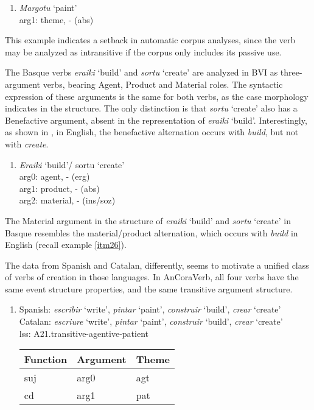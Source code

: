 \documentclass[english]{textolivre}
\begin{document}
\begin{enumerate}[label=(\arabic*),resume]
\item \label{itm32} \textit{Margotu} ‘paint’ \\
arg1: theme, - (abs)
\end{enumerate}
   
This example indicates a setback in automatic corpus analyses, since the verb may be analyzed as intransitive if the corpus only includes its passive use.

The Basque verbs \textit{eraiki} ‘build’ and \textit{sortu} ‘create’ are analyzed in BVI as three-argument verbs, bearing Agent, Product and Material roles. The syntactic expression of these arguments is the same for both verbs, as the case morphology indicates in the structure. The only distinction is that \textit{sortu} ‘create’ also has a Benefactive argument, absent in the representation of \textit{eraiki} ‘build’. Interestingly, as shown in , in English, the benefactive alternation occurs with \textit{build}, but not with \textit{create}.

\begin{enumerate}[label=(\arabic*),resume]
\item \label{itm33}\textit{Eraiki} ‘build’/ sortu ‘create’ \\
arg0: agent, - (erg) \\
arg1: product, - (abs) \\
arg2: material, - (ins/soz)
\end{enumerate}

The Material argument in the structure of \textit{eraiki} ‘build’ and \textit{sortu} ‘create’ in Basque resembles the material/product alternation, which occurs with \textit{build} in English (recall example \ref{itm26}).

The data from Spanish and Catalan, differently, seems to motivate a unified class of verbs of creation in those languages. In AnCoraVerb, all four verbs have the same event structure properties, and the same transitive argument structure.

\begin{enumerate}[label=(\arabic*),resume]
\item \label{itm34} Spanish: \textit{escribir} ‘write’, \textit{pintar} ‘paint’, \textit{construir} ‘build’, \textit{crear} ‘create’ \\
Catalan: \textit{escriure} ‘write’, \textit{pintar} ‘paint’, \textit{construir} ‘build’, \textit{crear} ‘create’ \\
lss: A21.transitive-agentive-patient \\
  \begin{tabular}{lll}
        \toprule
         Function	& Argument	& Theme \\
         \midrule
         suj	    & arg0      & agt \\
         cd	        & arg1	    & pat \\
         \bottomrule
        \end{tabular}
\end{enumerate}
\end{document}
